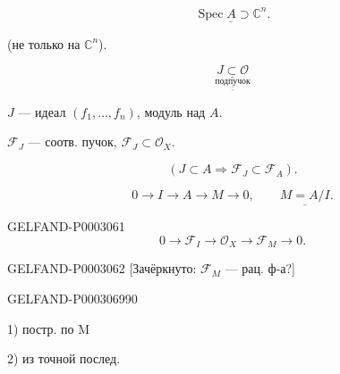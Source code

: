 \begin{equation*}\underline{\operatorname{Spec}A\supset\mathbb C^n}.\end{equation*}

(не только на $\mathbb C^n$).

\begin{equation*}\underset{\underline{\underline{\text{подпучок}}}}{\underline{J\subset\mathcal O}}\end{equation*}

$J$ --- идеал $(f_1,\ldots,f_n)$, модуль над $A$.

$\mathcal F_J$ --- соотв. пучок, $\mathcal F_J\subset\mathcal O_X$.

\begin{equation*}(J\subset A\Rightarrow\mathcal F_J\subset\mathcal F_A).\end{equation*}



\begin{equation*}0\longrightarrow I\longrightarrow A\longrightarrow M\longrightarrow0,\qquad\underline{M=A/I}.\end{equation*}

\begin{GelfandAdjacentEvidence}{GELFAND-P000306}{1}
\begin{equation*}0\longrightarrow\mathcal F_I\longrightarrow\mathcal O_X\longrightarrow\mathcal F_M\longrightarrow0.\end{equation*}

\end{GelfandAdjacentEvidence}


\begin{GelfandAdjacentEvidence}{GELFAND-P000306}{2}
[Зачёркнуто: $\mathcal F_M$ --- рац. ф-а?]

\end{GelfandAdjacentEvidence}


\begin{GelfandAdjacentEvidence}{GELFAND-P000306}{990}

1) постр. по M

2) из точной послед.

\end{GelfandAdjacentEvidence}

